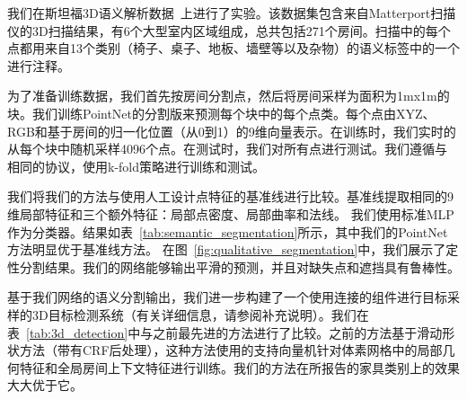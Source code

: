 

我们在斯坦福3D语义解析数据~\cite{armeni_cvpr16}上进行了实验。该数据集包含来自Matterport扫描仪的3D扫描结果，有6个大型室内区域组成，总共包括271个房间。扫描中的每个点都用来自13个类别（椅子、桌子、地板、墙壁等以及杂物）的语义标签中的一个进行注释。

为了准备训练数据，我们首先按房间分割点，然后将房间采样为面积为1mx1m的块。我们训练PointNet的分割版来预测每个块中的每个点类。每个点由XYZ、RGB和基于房间的归一化位置（从0到1）的9维向量表示。在训练时，我们实时的从每个块中随机采样4096个点。在测试时，我们对所有点进行测试。我们遵循与~\cite{armeni_cvpr16} 相同的协议，使用k-fold策略进行训练和测试。


我们将我们的方法与使用人工设计点特征的基准线进行比较。基准线提取相同的9维局部特征和三个额外特征：局部点密度、局部曲率和法线。 我们使用标准MLP作为分类器。结果如表~\ref{tab:semantic_segmentation}所示，其中我们的PointNet方法明显优于基准线方法。 在图~\ref{fig:qualitative_segmentation}中，我们展示了定性分割结果。我们的网络能够输出平滑的预测，并且对缺失点和遮挡具有鲁棒性。




基于我们网络的语义分割输出，我们进一步构建了一个使用连接的组件进行目标采样的3D目标检测系统（有关详细信息，请参阅补充说明）。我们在表~\ref{tab:3d_detection}中与之前最先进的方法进行了比较。之前的方法基于滑动形状方法（带有CRF后处理），这种方法使用的支持向量机针对体素网格中的局部几何特征和全局房间上下文特征进行训练。我们的方法在所报告的家具类别上的效果大大优于它。




